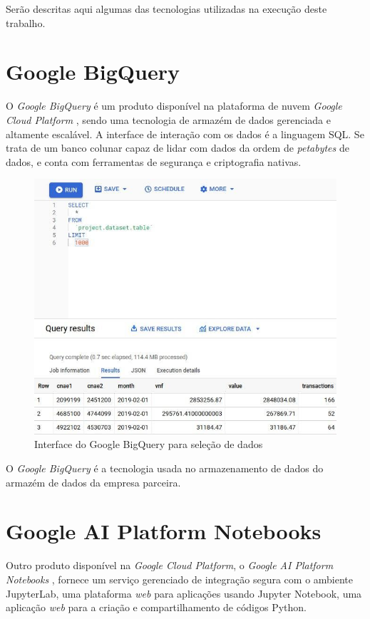
Serão descritas aqui algumas das tecnologias utilizadas na execução deste trabalho.

\section{Google BigQuery}

O \textit{Google BigQuery} é um produto disponível na plataforma de nuvem \textit{Google Cloud Platform} \cite{bigquery}, sendo uma tecnologia de armazém de dados gerenciada e altamente escalável. A interface de interação com os dados é a linguagem SQL. Se trata de um banco colunar capaz de lidar com dados da ordem de \textit{petabytes} de dados, e conta com ferramentas de segurança e criptografia nativas.

\begin{figure}[htb]
    \centering
    \caption{Interface do Google BigQuery para seleção de dados}
    \label{fig:bigquery}
    \includegraphics[scale=0.8]{images/bigquery.jpg}
    \fautor
\end{figure}

O \textit{Google BigQuery} é a tecnologia usada no armazenamento de dados do armazém de dados da empresa parceira.

\section{Google AI Platform Notebooks}

Outro produto disponível na \textit{Google Cloud Platform}, o \textit{Google AI Platform Notebooks} \cite{google-notebooks}, fornece um serviço gerenciado de integração segura com o ambiente JupyterLab, uma plataforma \textit{web} para aplicações usando Jupyter Notebook, uma aplicação \textit{web} para a criação e compartilhamento de códigos Python.

